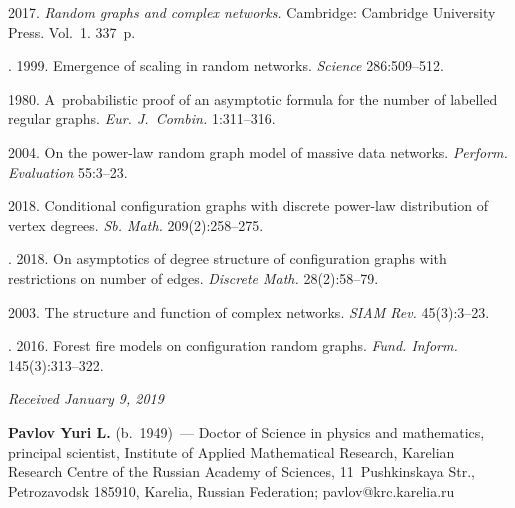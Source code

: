   \begin{multicols}{2}

\renewcommand{\bibname}{\protect\rmfamily References}

{\small\frenchspacing
 {%
 \begin{thebibliography}{9}


 2017. \textit{Random graphs and complex networks.} Cambridge:
Cambridge University Press.  Vol.~1. 337~p.

. 
1999. Emergence of scaling in random networks. \textit{Science} 286:509--512.

 1980. A~probabilistic proof of an asymptotic formula for the number
of labelled regular graphs. \textit{Eur. J.~Combin.} 1:311--316.

 2004. On the power-law random graph model of massive data
networks. \textit{Perform. Evaluation} 55:3--23.

 2018. Conditional configuration graphs
 with discrete power-law distribution of vertex degrees. 
 \textit{Sb. Math.} 209(2):258--275.

. 
2018. On asymptotics of degree structure of configuration graphs 
with restrictions on number of edges. \textit{Discrete Math.} 28(2):58--79.

2003. The structure and function of complex networks. \textit{SIAM Rev.} 45(3):3--23.

. 2016. Forest fire models on configuration random
graphs. \textit{Fund. Inform.} 145(3):313--322.
\end{thebibliography}

 }
 }

\end{multicols}


\hfill{\small\textit{Received January 9, 2019}}




\Contrl

\noindent
\textbf{Pavlov Yuri L.} (b.\ 1949)~--- 
Doctor of Science in physics and mathematics, principal scientist,
Institute of Applied Mathematical Research, Karelian Research Centre
of the Russian Academy of Sciences, 11~Pushkinskaya Str., Petrozavodsk 185910,
Karelia, Russian Federation;  \mbox{pavlov@krc.karelia.ru}


\label{end\stat}

\renewcommand{\bibname}{\protect\rm Литература}  
